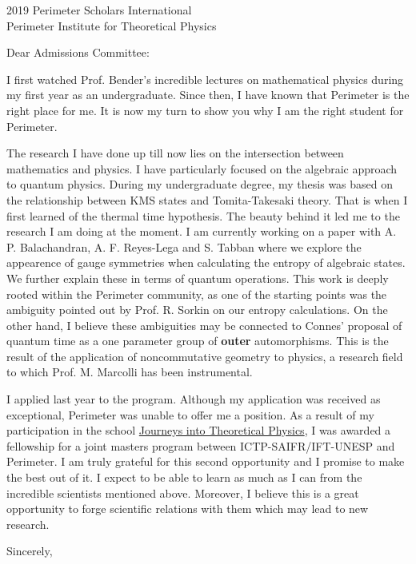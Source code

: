 \documentclass{letter}
\begin{document}
\begin{letter}{2019 Perimeter Scholars International \\ Perimeter Institute for Theoretical Physics}

\opening{Dear Admissions Committee:}

I first watched Prof. Bender's incredible lectures on mathematical physics during my first year as an undergraduate. Since then, I have known that Perimeter is the right place for me. It is now my turn to show you why I am the right student for Perimeter.

The research I have done up till now lies on the intersection between mathematics and physics. I have particularly focused on the algebraic approach to quantum physics. During my undergraduate degree, my thesis was based on the relationship between KMS states and Tomita-Takesaki theory. That is when I first learned of the thermal time hypothesis. The beauty behind it led me to the research I am doing at the moment. I am currently working on a paper with A. P. Balachandran, A. F. Reyes-Lega and S. Tabban where we explore the appearence of gauge symmetries when calculating the entropy of algebraic states. We further explain these in terms of quantum operations. This work is deeply rooted within the Perimeter community, as one of the starting points was the ambiguity pointed out by Prof. R. Sorkin on our entropy calculations. On the other hand, I believe these ambiguities may be connected to Connes' proposal of quantum time as a one parameter group of {\bf outer} automorphisms. This is the result of the application of noncommutative geometry to physics, a research field to which Prof. M. Marcolli has been instrumental.

I applied last year to the program. Although my application was received as exceptional, Perimeter was unable to offer me a position. As a result of my participation in the school \href{http://journeys.ictp-saifr.org/}{Journeys into Theoretical Physics}, I was awarded a fellowship for a joint masters program between ICTP-SAIFR/IFT-UNESP and Perimeter. I am truly grateful for this second opportunity and I promise to make the best out of it. I expect to be able to learn as much as I can from the incredible scientists mentioned above. Moreover, I believe this is a great opportunity to forge scientific relations with them which may lead to new research.

\closing{Sincerely,}

\end{letter}
\end{document}
